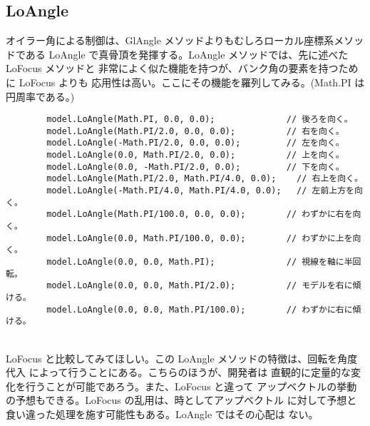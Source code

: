 \subsection{LoAngle}
オイラー角による制御は、GlAngle メソッドよりもむしろローカル座標系メソッドである
LoAngle で真骨頂を発揮する。LoAngle メソッドでは、先に述べた LoFocus メソッドと
非常によく似た機能を持つが、バンク角の要素を持つために LoFocus よりも
応用性は高い。ここにその機能を羅列してみる。(Math.PI は円周率である。)
\\
\begin{breakbox}
\begin{verbatim}
        model.LoAngle(Math.PI, 0.0, 0.0);              // 後ろを向く。
        model.LoAngle(Math.PI/2.0, 0.0, 0.0);          // 右を向く。
        model.LoAngle(-Math.PI/2.0, 0.0, 0.0);         // 左を向く。
        model.LoAngle(0.0, Math.PI/2.0, 0.0);          // 上を向く。
        model.LoAngle(0.0, -Math.PI/2.0, 0.0);         // 下を向く。
        model.LoAngle(Math.PI/2.0, Math.PI/4.0, 0.0);    // 右上を向く。
        model.LoAngle(-Math.PI/4.0, Math.PI/4.0, 0.0);   // 左前上方を向く。
        model.LoAngle(Math.PI/100.0, 0.0, 0.0);        // わずかに右を向く。
        model.LoAngle(0.0, Math.PI/100.0, 0.0);        // わずかに上を向く。
        model.LoAngle(0.0, 0.0, Math.PI);              // 視線を軸に半回転。
        model.LoAngle(0.0, 0.0, Math.PI/2.0);          // モデルを右に傾ける。
        model.LoAngle(0.0, 0.0, Math.PI/100.0);        // わずかに右に傾ける。
\end{verbatim}
\end{breakbox}
~ \\
LoFocus と比較してみてほしい。この LoAngle メソッドの特徴は、回転を角度代入
によって行うことにある。こちらのほうが、開発者は
直観的に定量的な変化を行うことが可能であろう。また、LoFocus と違って
アップベクトルの挙動の予想もできる。LoFocus の乱用は、時としてアップベクトル
に対して予想と食い違った処理を施す可能性もある。LoAngle ではその心配は
ない。

